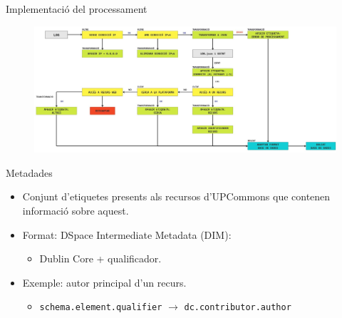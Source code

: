 \begin{frame}{Implementació del processament}
    \begin{figure}
        \includegraphics[width=1\textwidth]{figures/log-processing-workflow}
        \label{fig:log-processing-workflow}
    \end{figure}
\end{frame}


\begin{frame}{Metadades}
    \begin{itemize}%
        \item Conjunt d’etiquetes presents als recursos d’UPCommons que contenen informació sobre aquest.
        \item Format: DSpace Intermediate Metadata (DIM):
        \begin{itemize}%
            \item Dublin Core + qualificador.
        \end{itemize}
        \item Exemple: autor principal d'un recurs.
        \begin{itemize}%
            \item \texttt{schema.element.qualifier} \(\rightarrow\) \texttt{dc.contributor.author}
        \end{itemize}
    \end{itemize}
\end{frame}


